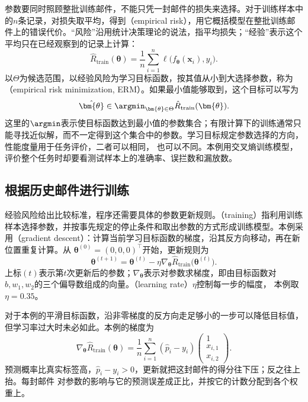 参数要同时照顾整批训练邮件，不能只凭一封邮件的损失来选择。对于训练样本中的$n$条记录，对损失取平均，得到（empirical risk），用它概括模型在整批训练邮件上的错误代价。“风险”沿用统计决策理论的说法，指平均损失；“经验”表示这个平均只在已经观察到的记录上计算：
\begin{equation}
  \hat{R}_{\mathrm{train}}(\bm{\theta})
  =\frac{1}{n}\sum_{i=1}^{n}\ell\bigl(f_{\bm{\theta}}(\bm{x}_i),y_i\bigr).
  \label{eq:spam-empirical-risk}
\end{equation}
以$\Theta$为候选范围，以经验风险为学习目标函数，按其值从小到大选择参数，称为
（empirical risk minimization, ERM）。如果最小值能够取到，这个目标可以写为
\begin{equation}
  \hat{\bm{\theta}}
  \in\argmin_{\bm{\theta}\in\Theta}\hat{R}_{\mathrm{train}}(\bm{\theta}).
  \label{eq:spam-erm}
\end{equation}
这里的$\argmin$表示使目标函数达到最小值的参数集合；有限计算下的训练通常只能寻找近似解，而不一定得到这个集合中的参数。学习目标规定参数选择的方向，性能度量用于任务评价，二者可以相同，
也可以不同。本例用交叉熵训练模型，评价整个任务时却要看测试样本上的准确率、误拦数和漏放数。

\subsection{根据历史邮件进行训练}

经验风险给出比较标准，程序还需要具体的参数更新规则。（training）指利用训练样本选择参数，并按事先规定的停止条件和取出参数的方式形成训练模型。本例采用（gradient descent）：计算当前学习目标函数的梯度，沿其反方向移动，再在新位置重复计算。从
$\bm{\theta}^{(0)}=(0,0,0)^{\top}$开始，更新规则为
\begin{equation}
  \bm{\theta}^{(t+1)}
  =\bm{\theta}^{(t)}-\eta\nabla_{\bm{\theta}}
  \hat{R}_{\mathrm{train}}\bigl(\bm{\theta}^{(t)}\bigr).
  \label{eq:spam-gradient-update}
\end{equation}
上标$(t)$表示第$t$次更新后的参数；$\nabla_{\bm{\theta}}$表示对参数求梯度，即由目标函数对
$b,w_1,w_2$的三个偏导数组成的向量。（learning rate）$\eta$控制每一步的幅度，
本例取$\eta=0.35$。

对于本例的平滑目标函数，沿非零梯度的反方向走足够小的一步可以降低目标值，但学习率过大时未必如此。本例的梯度为
\begin{equation}
  \nabla_{\bm{\theta}}\hat{R}_{\mathrm{train}}(\bm{\theta})
  =\frac{1}{n}\sum_{i=1}^{n}(\hat{p}_i-y_i)
  \begin{pmatrix}1\\x_{i,1}\\x_{i,2}\end{pmatrix}.
  \label{eq:spam-gradient}
\end{equation}
预测概率比真实标签高，$\hat{p}_i-y_i>0$，更新就把这封邮件的得分往下压；反之往上抬。每封邮件
对参数的影响与它的预测误差成正比，并按它的计数分配到各个权重上。

